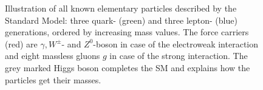 \begin{figure}

	\caption{Illustration of all known elementary particles described by the Standard Model: 
		three quark- (green) and three lepton- (blue) generations, ordered by increasing mass values.    
		The force carriers (red) are $\gamma, W^{\pm}$- and $Z^0$-boson in case of the electroweak interaction and eight massless gluons $g$ in case of the strong interaction. The grey marked Higgs boson completes the SM and explains how the particles get their masses. 
} \label{fig:SM}


\end{figure}


  
